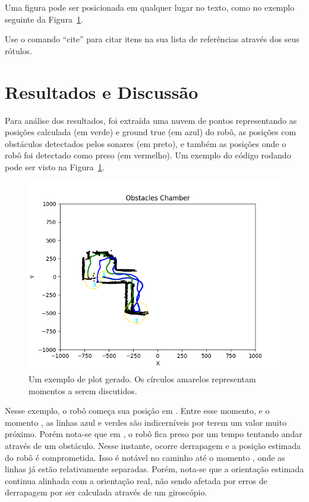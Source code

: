 \documentclass[twoside,conference,a4paper]{IEEEtran}
\newcommand*\circled[1]{\tikz[baseline=(char.base)]{
            \node[shape=circle,draw,inner sep=1pt] (char) {#1};}}
\begin{document}
Uma figura pode ser posicionada em qualquer lugar no texto, como no exemplo seguinte da Figura~\ref{fig:plot1}.


Use o comando ``cite'' para citar itens na sua lista de
referências através dos seus rótulos.


\section{Resultados e Discussão}

Para análise dos resultados, foi extraída uma nuvem de pontos representando as posições calculada (em verde) e ground true (em azul) do robô, as posições com obstáculos detectados pelos sonares (em preto), e também as posições onde o robô foi detectado como preso (em vermelho). Um exemplo do código rodando pode ser visto na Figura~\ref{fig:plot1}.

\begin{figure}[ht]
\centering
\includegraphics[width=1\hsize]{figuras/figure_3.png}
\caption{Um exemplo de plot gerado. Os círculos amarelos representam momentos a serem discutidos.}
\label{fig:plot1}
\end{figure}

Nesse exemplo, o robô começa sua posição em \circled{1}. Entre esse momento, e o momento \circled{2}, as linhas azul e verdes são indicerníveis por terem um valor muito próximo. Porém nota-se que em \circled{2}, o robô fica preso por um tempo tentando andar através de um obstáculo. Nesse instante, ocorre derrapagem e a posição estimada do robô é comprometida. Isso é notável no caminho até o momento \circled{3}, onde as linhas já estão relativamente separadas. Porém, nota-se que a orientação estimada continua alinhada com a orientação real, não sendo afetada por erros de derrapagem por ser calculada através de um giroscópio.
\end{document}
